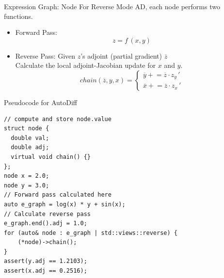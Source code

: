 \documentclass[dvipsnames]{beamer}
\newcommand{\pluseq}{\mathrel{+}=}
\begin{document}
\begin{frame}{Expression Graph: Node}
 For Reverse Mode AD, each node performs two functions.
\begin{itemize}
 \item Forward Pass:
 \begin{equation*}
     z = f\,(x, y)
 \end{equation*}
 \item Reverse Pass: Given $z$'s adjoint (partial gradient) $\overline{z}$
 \\Calculate the local adjoint-Jacobian update for $x$ and $y$.
 \begin{equation*}
 chain(\overline{z}, y, x) =
 \begin{cases}
  \overline{y} \pluseq \overline{z} \cdot z_{y}\,'\\
  \overline{x} \pluseq \overline{z} \cdot z_{x}\,'
 \end{cases}
 \end{equation*}
\end{itemize}
\end{frame}

\begin{frame}[fragile]{Pseudocode for AutoDiff}
\begin{verbatim}
// compute and store node.value
struct node {
  double val;
  double adj;
  virtual void chain() {}
};
node x = 2.0;
node y = 3.0;
// Forward pass calculated here
auto e_graph = log(x) * y + sin(x);
// Calculate reverse pass
e_graph.end().adj = 1.0;
for (auto& node : e_graph | std::views::reverse) {
    (*node)->chain();
}
assert(y.adj == 1.2103);
assert(x.adj == 0.2516);
\end{verbatim}
\end{frame}
\end{document}
